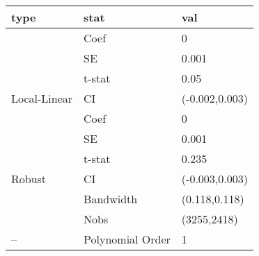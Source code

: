 
\begin{tabular}{lll}
\toprule
type & stat & val\\
\midrule
 & Coef & 0\\

 & SE & 0.001\\

 & t-stat & 0.05\\

\multirow{-4}{*}{\raggedright\arraybackslash Local-Linear} & CI & (-0.002,0.003)\\
\cmidrule{1-3}
 & Coef & 0\\

 & SE & 0.001\\

 & t-stat & 0.235\\

\multirow{-4}{*}{\raggedright\arraybackslash Robust} & CI & (-0.003,0.003)\\
\cmidrule{1-3}
 & Bandwidth & (0.118,0.118)\\

 & Nobs & (3255,2418)\\

\multirow{-3}{*}{\raggedright\arraybackslash --} & Polynomial Order & 1\\
\bottomrule
\end{tabular}